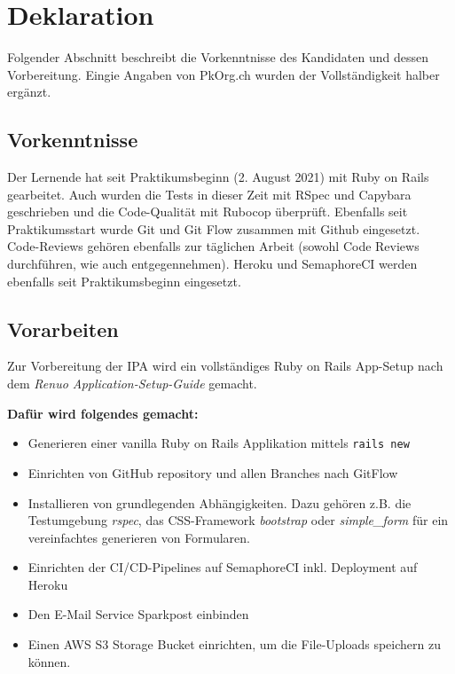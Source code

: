 \chapter{Deklaration} \label{ch:declaration}

Folgender Abschnitt beschreibt die Vorkenntnisse des Kandidaten und dessen Vorbereitung. 
Eingie Angaben von PkOrg.ch wurden der Vollständigkeit halber ergänzt.

\section{Vorkenntnisse}

Der Lernende hat seit Praktikumsbeginn (2. August 2021) mit Ruby on Rails gearbeitet. Auch wurden die Tests in dieser Zeit mit RSpec und Capybara geschrieben und die Code-Qualität mit Rubocop überprüft.
Ebenfalls seit Praktikumsstart wurde Git und Git Flow zusammen mit Github eingesetzt. Code-Reviews gehören ebenfalls zur täglichen Arbeit (sowohl Code Reviews durchführen, wie auch entgegennehmen).
Heroku und SemaphoreCI werden ebenfalls seit Praktikumsbeginn eingesetzt.

\section{Vorarbeiten}

Zur Vorbereitung der IPA wird ein vollständiges Ruby on Rails App-Setup nach dem \emph{Renuo Application-Setup-Guide} \cite{renuo_application_setup_guide} gemacht.

\textbf{Dafür wird folgendes gemacht:}
\begin{itemize}
    \item Generieren einer vanilla Ruby on Rails Applikation mittels \texttt{rails new}
    \item Einrichten von GitHub repository und allen Branches nach GitFlow
    \item Installieren von grundlegenden Abhängigkeiten. Dazu gehören z.B. die Testumgebung \emph{rspec},
          das CSS-Framework \emph{bootstrap} oder \emph{simple\_form} für ein vereinfachtes generieren von Formularen.
    \item Einrichten der CI/CD-Pipelines auf SemaphoreCI inkl. Deployment auf Heroku
    \item Den E-Mail Service Sparkpost einbinden
    \item Einen AWS S3 Storage Bucket einrichten, um die File-Uploads speichern zu können.
\end{itemize}

